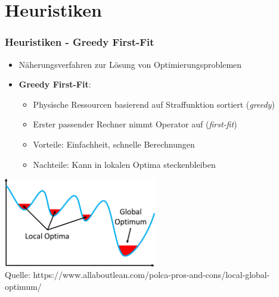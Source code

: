 \documentclass{beamer}
\begin{document}
\section{Heuristiken}
\begin{frame}
\frametitle{Heuristiken - Greedy First-Fit}
\begin{itemize}
    \item Näherungsverfahren zur Lösung von Optimierungsproblemen
    \item \textbf{Greedy First-Fit}: 
    \begin{itemize}
        \item Physische Ressourcen basierend auf Straffunktion sortiert (\textit{greedy})
        \item Erster passender Rechner nimmt Operator auf (\textit{first-fit})
        \item Vorteile: Einfachheit, schnelle Berechnungen
        \item Nachteile: Kann in lokalen Optima steckenbleiben
    \end{itemize}
\end{itemize}
\begin{center}
    \includegraphics[width=0.5\textwidth]{res/Local-Global-Optimum.png} \\
    \tiny \color{gray} Quelle: https://www.allaboutlean.com/polca-pros-and-cons/local-global-optimum/
\end{center}
\end{frame}
\end{document}
